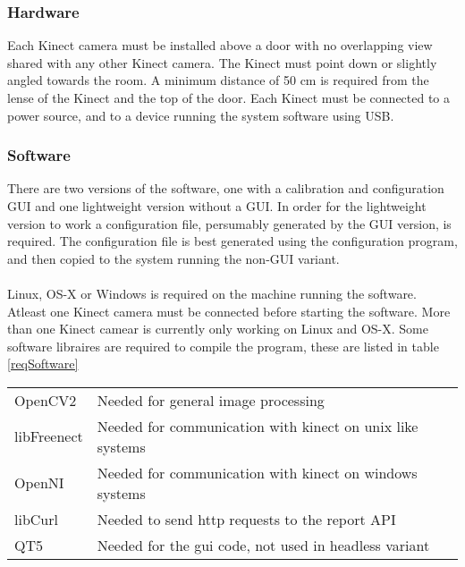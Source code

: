 \subsubsection{Hardware}
Each Kinect camera must be installed above a door with no overlapping view shared with any other Kinect camera. The Kinect must point down or slightly angled towards the room. A minimum distance of 50 cm is required from the lense of the Kinect and the top of the door. Each Kinect must be connected to a power source, and to a device running the system software using USB.
\subsubsection{Software}
There are two versions of the software, one with a calibration and configuration GUI and one lightweight version without a GUI. In order for the lightweight version to work a configuration file, persumably generated by the GUI version, is required.
The configuration file is best generated using the configuration program, and then copied to the system running the non-GUI variant.
\\
\\
Linux, OS-X or Windows is required on the machine running the software. Atleast one Kinect camera must be connected before starting the software. More than one Kinect camear is currently only working on Linux and OS-X. 
Some software libraires are required to compile the program, these are listed in table \ref{reqSoftware}

\begin{tabular}{ l l }
  OpenCV2 & Needed for general image processing  \\
  libFreenect & Needed for communication with kinect on unix like systems  \\
  OpenNI & Needed for communication with kinect on windows systems  \\
  libCurl & Needed to send http requests to the report API \\
  QT5 & Needed for the gui code, not used in headless variant \\
\end{tabular}